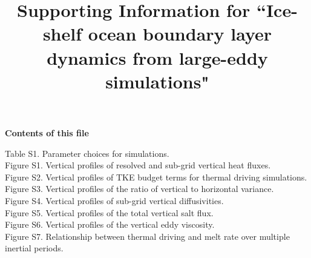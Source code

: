 \documentclass[tc, manuscript]{copernicus}
\begin{document}
\title{Supporting Information for ``Ice-shelf ocean boundary layer dynamics from large-eddy simulations"}







\maketitle

\noindent\textbf{Contents of this file}

\noindent
Table S1. Parameter choices for simulations.\\
Figure S1. Vertical profiles of resolved and sub-grid vertical heat fluxes.\\
Figure S2. Vertical profiles of TKE budget terms for thermal driving simulations.\\
Figure S3. Vertical profiles of the ratio of vertical to horizontal variance.\\
Figure S4. Vertical profiles of sub-grid vertical diffusivities.\\
Figure S5. Vertical profiles of the total vertical salt flux.\\
Figure S6. Vertical profiles of the vertical eddy viscosity.\\
Figure S7. Relationship between thermal driving and melt rate over multiple inertial periods. 

\clearpage
\end{document}
